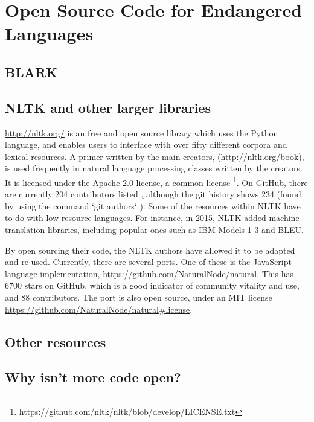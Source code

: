 \section{Open Source Code for Endangered Languages}\label{sec:endlangcode}
\subsection{BLARK}
\subsection{NLTK and other larger libraries}

\href{NLTK (Natural Language Toolkit)}{http://nltk.org/} is an free and open source library which uses the Python language, and enables users to interface with over fifty different corpora and lexical resources. A primer written by the main creators, \href{Natural Language Processing with Python}(http://nltk.org/book), is used frequently in natural language processing classes written by the creators. It is licensed under the Apache 2.0 license, a common license \footnote{https://github.com/nltk/nltk/blob/develop/LICENSE.txt}. On GitHub, there are currently 204 contributors listed \href{https://github.com/nltk/nltk/graphs/contributors}, although the git history shows 234 (found by using the command `git authors` %
). Some of the resources within NLTK have to do with low resource languages. For instance, in 2015, NLTK added machine translation libraries, including popular ones such as IBM Models 1-3 and BLEU.

By open sourcing their code, the NLTK authors have allowed it to be adapted and re-used. Currently, there are several ports.
One of these is the JavaScript language implementation, \href{https://github.com/NaturalNode/natural}{https://github.com/NaturalNode/natural}. This has 6700 stars on GitHub, which is a good indicator of community vitality and use, and 88 contributors. The port is also open source, under an MIT license \href{https://github.com/NaturalNode/natural\#license}{https://github.com/NaturalNode/natural\#license}.

\subsection{Other resources}

\subsection{Why isn't more code open?}

